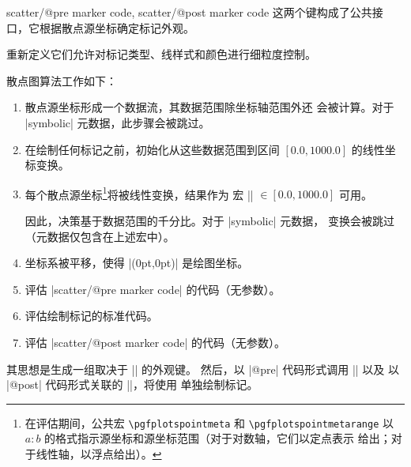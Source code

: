{\begin{pgfplotsxycodekeylist}{%
    scatter/@pre marker code,
    scatter/@post marker code%
}
\label{pgfplots:example:pointmeta:scatter}
    这两个键构成了公共接口，它根据散点源坐标确定标记外观。

    重新定义它们允许对标记类型、线样式和颜色进行细粒度控制。

    散点图算法工作如下：
    \begin{enumerate}
        \item 散点源坐标形成一个数据流，其数据范围除坐标轴范围外还
            会被计算。对于 |symbolic| 元数据，此步骤会被跳过。
        \item 在绘制任何标记之前，初始化从这些数据范围到区间
            $[0.0,1000.0]$ 的线性坐标变换。
        \item 每个散点源坐标\footnote{在评估期间，公共宏
            \texttt{\textbackslash pgfplotspointmeta} 和
            \texttt{\textbackslash pgfplotspointmetarange} 以 $a:b$
            的格式指示源坐标和源坐标范围（对于对数轴，它们以定点表示
            给出；对于线性轴，以浮点给出）。}将被线性变换，结果作为
            宏 |\pgfplotspointmetatransformed| $ \in [0.0,1000.0]$
            可用。

            因此，决策基于数据范围的千分比。对于 |symbolic| 元数据，
            变换会被跳过（元数据仅包含在上述宏中）。
        \item \pgfname{} 坐标系被平移，使得 |(0pt,0pt)| 是绘图坐标。
        \item 评估 |scatter/@pre marker code| 的代码（无参数）。
        \item 评估绘制标记的标准代码。
        \item 评估 |scatter/@post marker code| 的代码（无参数）。
    \end{enumerate}
    其思想是生成一组取决于 |\pgfplotspointmetatransformed| 的外观键。
    然后，以 |@pre| 代码形式调用 |\scope| 以及
    以 |@post| 代码形式关联的 |\endscope|，将使用  单独绘制标记。


\end{pgfplotsxycodekeylist}}

